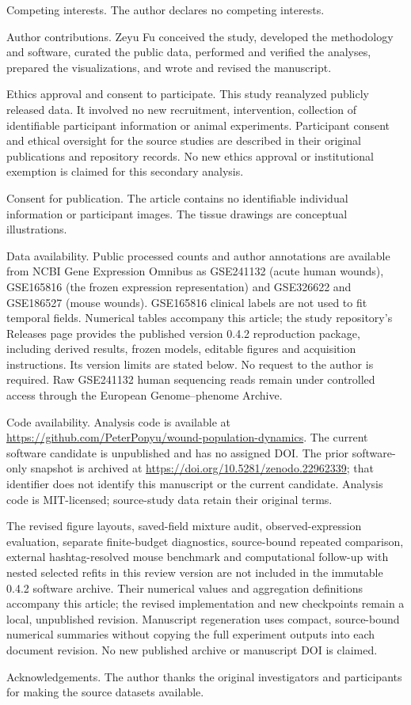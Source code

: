 \documentclass[10pt,a4paper]{article}
\begin{document}
Competing interests. The author declares no competing interests.

Author contributions. Zeyu Fu conceived the study, developed the methodology and software, curated the public data, performed and verified the analyses, prepared the visualizations, and wrote and revised the manuscript.

Ethics approval and consent to participate. This study reanalyzed publicly released data. It involved no new recruitment, intervention, collection of identifiable participant information or animal experiments. Participant consent and ethical oversight for the source studies are described in their original publications and repository records. No new ethics approval or institutional exemption is claimed for this secondary analysis.

Consent for publication. The article contains no identifiable individual information or participant images. The tissue drawings are conceptual illustrations.

Data availability. Public processed counts and author annotations are available from NCBI Gene Expression Omnibus as GSE241132 (acute human wounds), GSE165816 (the frozen expression representation) and GSE326622 and GSE186527 (mouse wounds). GSE165816 clinical labels are not used to fit temporal fields. Numerical tables accompany this article; the study repository's Releases page provides the published version 0.4.2 reproduction package, including derived results, frozen models, editable figures and acquisition instructions. Its version limits are stated below. No request to the author is required. Raw GSE241132 human sequencing reads remain under controlled access through the European Genome--phenome Archive.

Code availability. Analysis code is available at \url{https://github.com/PeterPonyu/wound-population-dynamics}. The current software candidate is unpublished and has no assigned DOI. The prior software-only snapshot is archived at \url{https://doi.org/10.5281/zenodo.22962339}; that identifier does not identify this manuscript or the current candidate. Analysis code is MIT-licensed; source-study data retain their original terms.

The revised figure layouts, saved-field mixture audit, observed-expression evaluation, separate finite-budget diagnostics, source-bound repeated comparison, external hashtag-resolved mouse benchmark and computational follow-up with nested selected refits in this review version are not included in the immutable 0.4.2 software archive. Their numerical values and aggregation definitions accompany this article; the revised implementation and new checkpoints remain a local, unpublished revision. Manuscript regeneration uses compact, source-bound numerical summaries without copying the full experiment outputs into each document revision. No new published archive or manuscript DOI is claimed.

Acknowledgements. The author thanks the original investigators and participants for making the source datasets available.
\FloatBarrier



\end{document}
